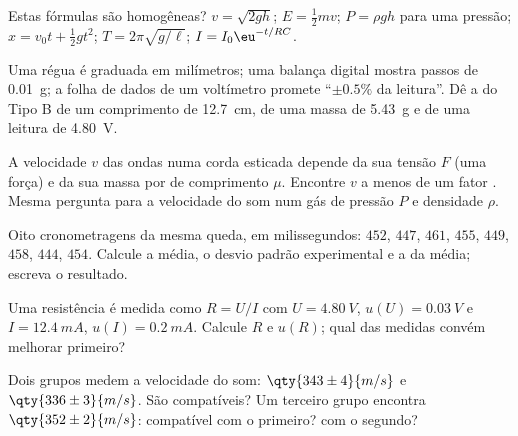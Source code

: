 \begin{exercise}[$\star$]\label{exo:b1:units-dimensions:3}
Estas fórmulas são homogêneas? $v = \sqrt{2gh}$;
$E = \tfrac12 m v$; $P = \rho g h$ para uma pressão; $x = v_0 t +
\tfrac12 g t^2$; $T = 2\pi\sqrt{g/\ell}$; $I = I_0 \eu^{-t/RC}$.
\end{exercise}

\begin{exercise}[$\star$]\label{exo:b1:units-dimensions:4}
Uma régua é graduada em milímetros; uma balança digital mostra passos de
\qty{0.01}{g}; a folha de dados de um voltímetro promete ``$\pm 0.5\%$ da
leitura''. Dê a  do Tipo B de um comprimento de
\qty{12.7}{cm}, de uma massa de \qty{5.43}{g} e de uma leitura de \qty{4.80}{V}.
\end{exercise}

\begin{exercise}[$\star\star$]\label{exo:b1:units-dimensions:5}
A velocidade $v$ das ondas numa corda esticada depende da sua tensão $F$
(uma força) e da sua massa por  de comprimento $\mu$. Encontre $v$ a
menos de um fator . Mesma pergunta para a velocidade do som num
gás de pressão $P$ e densidade $\rho$.
\end{exercise}

\begin{exercise}[$\star\star$]\label{exo:b1:units-dimensions:6}
Oito cronometragens da mesma queda, em milissegundos: $452$, $447$, $461$,
$455$, $449$, $458$, $444$, $454$. Calcule a média, o desvio padrão
experimental e a  da média; escreva o resultado.
\end{exercise}

\begin{exercise}[$\star\star$]\label{exo:b1:units-dimensions:7}
Uma resistência é medida como $R = U/I$ com $U = \qty{4.80}{V}$,
$u(U) = \qty{0.03}{V}$ e $I = \qty{12.4}{mA}$, $u(I) = \qty{0.2}{mA}$.
Calcule $R$ e $u(R)$; qual das medidas convém melhorar primeiro?
\end{exercise}

\begin{exercise}[$\star\star$]\label{exo:b1:units-dimensions:8}
Dois grupos medem a velocidade do som: $\qty{343\pm4}{m/s}$ e
$\qty{336\pm3}{m/s}$. São compatíveis? Um terceiro grupo encontra
$\qty{352\pm2}{m/s}$: compatível com o primeiro? com o segundo?
\end{exercise}

